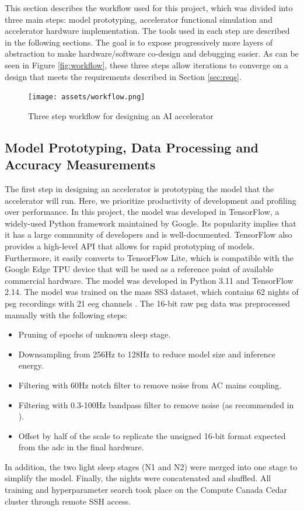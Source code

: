This section describes the workflow used for this project, which was divided into three main steps: model prototyping, accelerator functional simulation and accelerator hardware implementation.
The tools used in each step are described in the following sections. The goal is to expose progressively more layers of abstraction to make hardware/software co-design and debugging easier. As
can be seen in Figure \ref{fig:workflow}, these three steps allow iterations to converge on a design that meets the requirements described in Section \ref{sec:reqs}.
\begin{figure}[H]
    \centering
    \caption{Three step workflow for designing an AI accelerator}
    \texttt{[image: assets/workflow.png]}
\end{figure}
\label{fig:workflow}

\subsection{Model Prototyping, Data Processing and Accuracy Measurements}
The first step in designing an accelerator is prototyping the model that the accelerator will run. Here, we prioritize productivity of development and profiling over performance. In this project,
the model was developed in TensorFlow, a widely-used Python framework maintained by Google. Its popularity implies that it has a large community of developers and is well-documented. TensorFlow
also provides a high-level API that allows for rapid prototyping of models. Furthermore, it easily converts to TensorFlow Lite, which is compatible with the Google Edge TPU device that will be used
as a reference point of available commercial hardware. The model was developed in Python 3.11 and TensorFlow 2.14. The model was trained on the \ac{mass} SS3 dataset, which contains 62 nights of
\ac{psg} recordings with 21 \ac{eeg} channels \cite*{SP3/9MYUCS_2022}. The 16-bit raw \ac{psg} data was preprocessed manually with the following steps:
\begin{itemize}
    \item Pruning of epochs of unknown sleep stage.
    \item Downsampling from 256Hz to 128Hz to reduce model size and inference energy.
    \item Filtering with 60Hz notch filter to remove noise from AC mains coupling.
    \item Filtering with 0.3-100Hz bandpass filter to remove noise (as recommended in \cite{supratak2017deepsleepnet}).
    \item Offset by half of the scale to replicate the unsigned 16-bit format expected from the \ac{adc} in the final hardware.
\end{itemize}
In addition, the two light sleep stages (N1 and N2) were merged into one stage to simplify the model. Finally, the nights were concatenated and shuffled.
All training and hyperparameter search took place on the Compute Canada Cedar cluster through remote SSH access.

